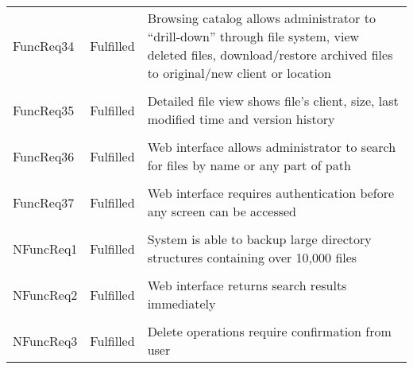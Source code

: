 \begin{longtable}{ l l p{5cm} }
    FuncReq34           & Fulfilled                 & Browsing catalog allows
                                                      administrator to
                                                      ``drill-down'' through
                                                      file system, view deleted
                                                      files, download/restore
                                                      archived files to
                                                      original/new client or
                                                      location
    \\ \\
    FuncReq35           & Fulfilled                 & Detailed file view shows
                                                      file's client, size, last
                                                      modified time and version
                                                      history
    \\ \\
    FuncReq36           & Fulfilled                 & Web interface allows
                                                      administrator to search
                                                      for files by name or any
                                                      part of path
    \\ \\
    FuncReq37           & Fulfilled                 & Web interface requires
                                                      authentication before any
                                                      screen can be accessed
    \\ \\
    NFuncReq1           & Fulfilled                 & System is able to backup
                                                      large directory
                                                      structures containing
                                                      over 10,000 files
    \\ \\
    NFuncReq2           & Fulfilled                 & Web interface returns
                                                      search results
                                                      immediately
    \\ \\
    NFuncReq3           & Fulfilled                 & Delete operations require
                                                      confirmation from user

\end{longtable}
